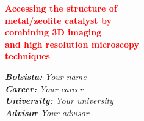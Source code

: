 \begin{titlepage}
\centering
\vspace*{0.35\textheight}
{\textcolor{red}{\Huge \textbf{Accessing the structure of \\ metal/zeolite catalyst by \\combining 3D imaging \\ and high resolution microscopy\\ techniques}}} %
\vspace{2cm}
\Large

\textbf{\textit{Bolsista:}} \textit{Your name}\\[0.5em] %
 \textit{\textbf{Career:}} \textit{Your career} \\[0.5em] %
 \textit{\textbf{University:}} \textit{Your university} \\[0.5em] %
 \textit{\textbf{Advisor}} \textit{Your advisor} %
\end{titlepage}
\restoregeometry

